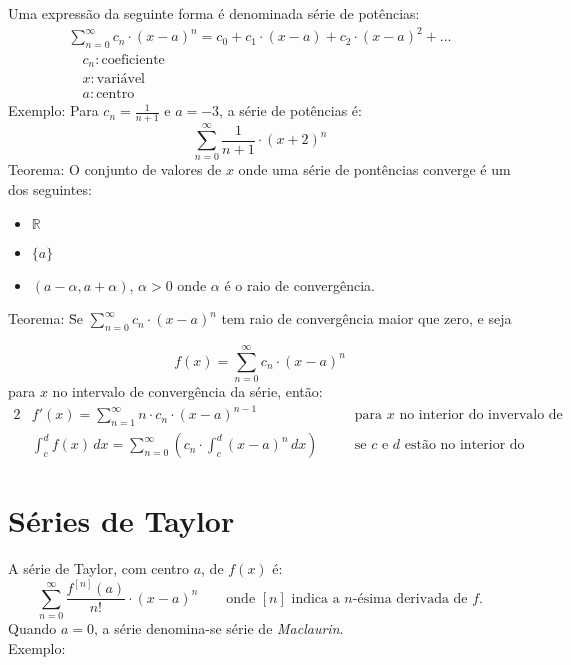 \documentclass{article}
\begin{document}
Uma express\~ao da seguinte forma \'e denominada s\'erie de pot\^encias:
\begin{align*}
  & \sum_{n=0}^\infty c_n \cdot {(x - a)}^n = c_0 + c_1 \cdot (x - a) + c_2 \cdot {(x - a)}^2 + \hdots & \\
  & \quad c_n: \text{coeficiente} \\
  & \quad x: \text{vari\'avel} \\
  & \quad a: \text{centro}
\end{align*}
Exemplo: Para $c_n = \frac{1}{n + 1}$ e $a = -3$, a s\'erie de pot\^encias \'e:
\[ \sum_{n=0}^\infty \frac{1}{n + 1} \cdot {(x + 2)}^n \]
Teorema: O conjunto de valores de $x$ onde uma s\'erie de pont\^encias converge \'e um dos seguintes:
\begin{itemize}
  \item $\mathbb{R}$
  \item $\{a\}$
  \item $(a - \alpha, a + \alpha)$, $\alpha > 0$ \qquad onde $\alpha$ \'e o raio de converg\^encia.
\end{itemize}
\begin{tabbing}
  Teorema: \=Se $\sum\limits_{n=0}^\infty c_n \cdot {(x - a)}^n$ tem raio de converg\^encia maior que zero, e seja \\[0pt]
  \>\begin{minipage}{0.5\textwidth}
      \[ f(x) = \sum_{n=0}^\infty c_n \cdot {(x - a)}^n \]
      para $x$ no intervalo de converg\^encia da s\'erie, ent\~ao:
      \begin{alignat*}{2}
        &f'(x) = \sum_{n=1}^\infty n \cdot c_n \cdot {(x - a)}^{n - 1} && \quad \text{para $x$ no interior do invervalo de converg\^encia.} \\
        &\int_c^d f(x)\,dx = \sum_{n=0}^\infty (c_n \cdot \int_c^d {(x - a)}^n\,dx) && \quad \text{se $c$ e $d$ est\~ao no interior do intervalo de converg\^encia.}
      \end{alignat*}
    \end{minipage}
\end{tabbing}



\newpage
\section{S\'eries de Taylor}

A s\'erie de Taylor, com centro $a$, de $f(x)$ \'e:
\begin{equation*}
  \sum_{n=0}^{\infty}\frac{f^{[n]}(a)}{n!} \cdot {(x - a)}^n
  \qquad\text{onde $[n]$ indica a $n$-\'esima derivada de $f$.}
\end{equation*}
Quando $a=0$, a s\'erie denomina-se s\'erie de \textit{Maclaurin}. \\[10pt]
Exemplo: \\[-5pt]
\end{document}
